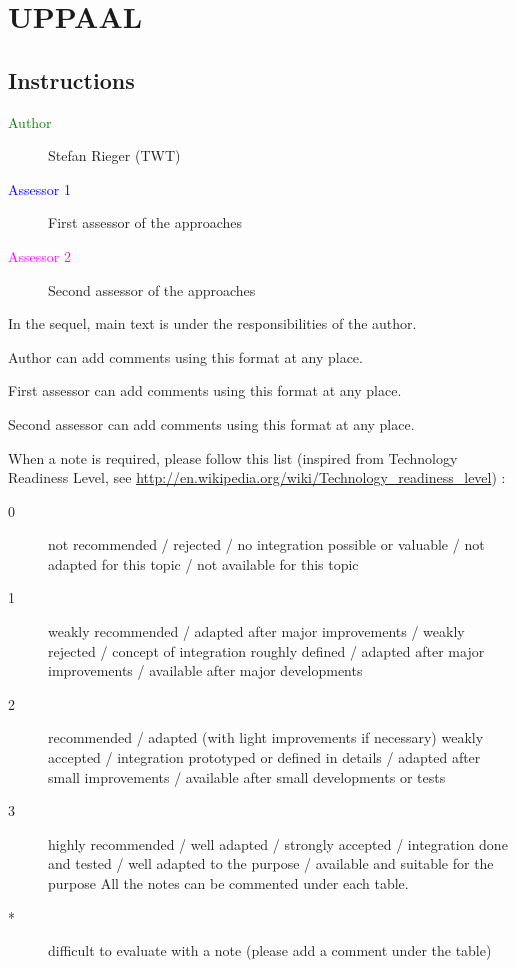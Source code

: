 \chapter{UPPAAL}
\label{sec:uppaal}

\section{Instructions}

\begin{description}
\item[\textcolor{green}{Author}] Stefan Rieger (TWT)
\item[\textcolor{blue}{Assessor 1}] First assessor of the approaches 
\item[\textcolor{magenta}{Assessor 2}] Second assessor of the approaches 
\end{description}

In the sequel, main text is under the responsibilities of the author.

\begin{author_comment}
Author can add comments using this format at any place.
\end{author_comment}

\begin{assessor1}
First assessor can add comments using this format at any place.
\end{assessor1}

\begin{assessor2}
Second assessor can add comments using this format at any place.
\end{assessor2}

When a note is required, please follow this list (inspired from Technology Readiness Level, see \url{http://en.wikipedia.org/wiki/Technology\_readiness\_level}) :

\begin{description}
\item[0] not recommended / rejected / no integration possible or valuable / not adapted for this topic / not available for this topic
\item[1] weakly recommended / adapted after major improvements / weakly rejected / concept of integration roughly defined / adapted after major improvements / available after major developments
\item[2] recommended / adapted (with light improvements if necessary)  weakly accepted / integration prototyped or defined in details / adapted after small improvements / available after small developments or tests
\item[3] highly recommended / well adapted / strongly accepted / integration done and tested / well adapted to the purpose / available and suitable for the purpose All the notes can be commented under each table.
\item[*] difficult to evaluate with a note (please add a comment under the table)
\end{description}



